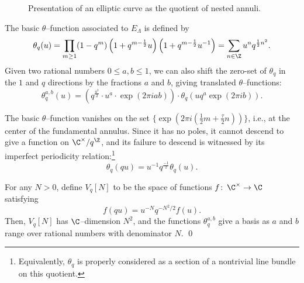 \begin{figure}
\begin{center}
\end{center}
\caption{Presentation of an elliptic curve as the quotient of nested annuli.}\label{AnnulusPicture}
\end{figure}

\begin{definition}
The basic \(\theta\)--function associated to \(E_\Lambda\) is defined by \[\theta_q(u) = \prod_{m \ge 1} (1 - q^m) \left(1 + q^{m-\frac{1}{2}}u\right) \left(1 + q^{m-\frac{1}{2}}u^{-1}\right) = \sum_{n \in \Z} u^n q^{\frac{1}{2} n^2}.\]  Given two rational numbers \(0 \le a, b \le 1\), we can also shift the zero-set of \(\theta_q\) in the \(1\) and \(q\) directions by the fractions \(a\) and \(b\), giving translated \(\theta\)--functions: \[\theta_q^{a,b}(u) = \left(q^{\frac{a^2}{2}} \cdot u^a \cdot \exp(2 \pi i a b) \right) \cdot \theta_q(u q^a \exp(2 \pi i b)).\]
\end{definition}

The basic \(\theta\)--function vanishes on the set \(\{\exp(2 \pi i (\frac{1}{2}m + \frac{\tau}{2}n))\}\), i.e., at the center of the fundamental annulus.  Since it has no poles, it cannot descend to give a function on \(\C^\times / q^{\Z}\), and its failure to descend is witnessed by its imperfect periodicity relation:\footnote{Equivalently, \(\theta_q\) is properly considered as a section of a nontrivial line bundle on this quotient.} \[\theta_q(qu) = u^{-1} q^{\frac{-1}{2}} \theta_q(u).\]

\begin{lemma}
For any \(N > 0\), define \(V_q[N]\) to be the space of functions \(f\co \C^\times \to \C\) satisfying \[f(q u) = u^{-N}  q^{-N^2/2} f(u).\]  Then, \(V_q[N]\) has \(\C\)--dimension \(N^2\), and the functions \(\theta_q^{a, b}\) give a basis as \(a\) and \(b\) range over rational numbers with denominator \(N\). \qed
\end{lemma}

